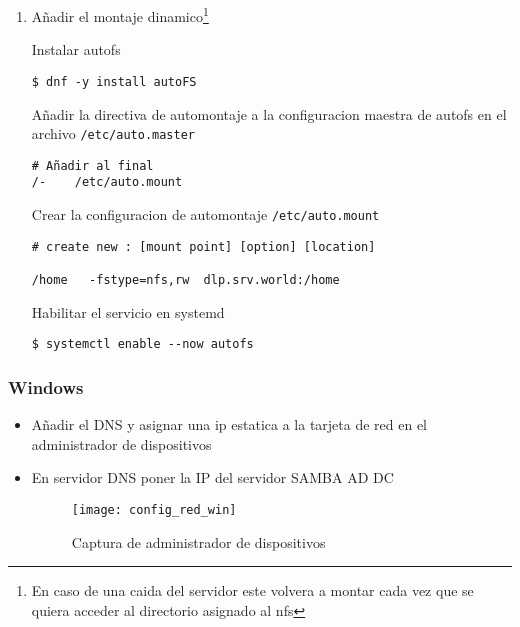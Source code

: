\documentclass[../main.tex]{subfiles}
\begin{document}
\begin{enumerate}
  \item Añadir el montaje dinamico\footnote{En caso de una caida
        del servidor este volvera a montar cada vez que se
        quiera acceder al directorio asignado al \Gls{nfs}}

        Instalar \Gls{autofs}
        \begin{listing}[H]
\begin{verbatim}
$ dnf -y install autoFS
\end{verbatim}
        \end{listing}
        Añadir la directiva de automontaje a la configuracion maestra de
        \gls{autofs} en el archivo \texttt{/etc/auto.master}

        \begin{listing}[H]
\begin{verbatim}
# Añadir al final
/-    /etc/auto.mount
\end{verbatim}
        \end{listing}

        Crear la configuracion de automontaje \texttt{/etc/auto.mount}
        \begin{listing}[H]
\begin{verbatim}
# create new : [mount point] [option] [location]

/home   -fstype=nfs,rw  dlp.srv.world:/home
\end{verbatim}
        \end{listing}

        Habilitar el servicio en \gls{systemd}
        \begin{listing}[H]
\begin{verbatim}
$ systemctl enable --now autofs
\end{verbatim}
        \end{listing}

\end{enumerate}


\newpage{}



\subsubsection{Windows}\label{sec:cliente_win}

\begin{itemize}
  \item Añadir el DNS y asignar una ip estatica a la tarjeta de red en el administrador de dispositivos
  \item En servidor DNS poner la IP del servidor SAMBA AD DC
        \begin{figure}[H]
          \centering
          \texttt{[image: config\_red\_win]}
          \caption{Captura de administrador de dispositivos}\label{fig:confrwin}
        \end{figure}

\end{itemize}
\end{document}
